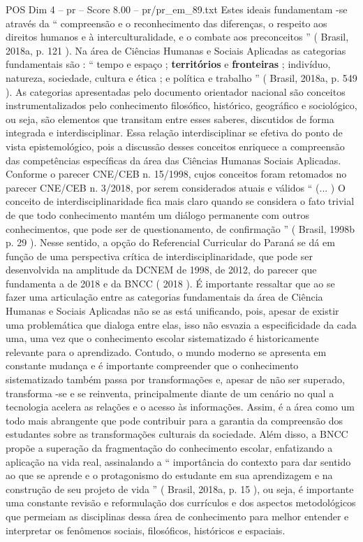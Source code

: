 \begin{textsample}{POS Dim 4 – pr – Score 8.00 – pr/pr\_em\_89.txt}
Estes ideais fundamentam -se através da “ compreensão e o reconhecimento das diferenças, o respeito aos direitos humanos e à interculturalidade, e o combate aos preconceitos ” ( Brasil, 2018a, p. 121 ).
Na área de Ciências Humanas e Sociais Aplicadas as categorias fundamentais são : “ tempo e espaço ; \textbf{territórios} e \textbf{fronteiras} ; indivíduo, natureza, sociedade, cultura e ética ; e política e trabalho ” ( Brasil, 2018a, p. 549 ).
As categorias apresentadas pelo documento orientador nacional são conceitos instrumentalizados pelo conhecimento filosófico, histórico, geográfico e sociológico, ou seja, são elementos que transitam entre esses saberes, discutidos de forma integrada e interdisciplinar.
Essa relação interdisciplinar se efetiva do ponto de vista epistemológico, pois a discussão desses conceitos enriquece a compreensão das competências específicas da área das Ciências Humanas Sociais Aplicadas.
Conforme o parecer CNE/CEB n. 15/1998, cujos conceitos foram retomados no parecer CNE/CEB n. 3/2018, por serem considerados atuais e válidos “ (... ) O conceito de interdisciplinaridade fica mais claro quando se considera o fato trivial de que todo conhecimento mantém um diálogo permanente com outros conhecimentos, que pode ser de questionamento, de confirmação ” ( Brasil, 1998b p. 29 ).
Nesse sentido, a opção do Referencial Curricular do Paraná se dá em função de uma perspectiva crítica de interdisciplinaridade, que pode ser desenvolvida na amplitude da DCNEM de 1998, de 2012, do parecer que fundamenta a de 2018 e da BNCC ( 2018 ).
É importante ressaltar que ao se fazer uma articulação entre as categorias fundamentais da área de Ciência Humanas e Sociais Aplicadas não se as está unificando, pois, apesar de existir uma problemática que dialoga entre elas, isso não esvazia a especificidade da cada uma, uma vez que o conhecimento escolar sistematizado é historicamente relevante para o aprendizado.
Contudo, o mundo moderno se apresenta em constante mudança e é importante compreender que o conhecimento sistematizado também passa por transformações e, apesar de não ser superado, transforma -se e se reinventa, principalmente diante de um cenário no qual a tecnologia acelera as relações e o acesso às informações.
Assim, é a área como um todo mais abrangente que pode contribuir para a garantia da compreensão dos estudantes sobre as transformações culturais da sociedade.
Além disso, a BNCC propõe a superação da fragmentação do conhecimento escolar, enfatizando a aplicação na vida real, assinalando a “ importância do contexto para dar sentido ao que se aprende e o protagonismo do estudante em sua aprendizagem e na construção de seu projeto de vida ” ( Brasil, 2018a, p. 15 ), ou seja, é importante uma constante revisão e reformulação dos currículos e dos aspectos metodológicos que permeiam as disciplinas dessa área de conhecimento para melhor entender e interpretar os fenômenos sociais, filosóficos, históricos e espaciais.

\end{textsample}
